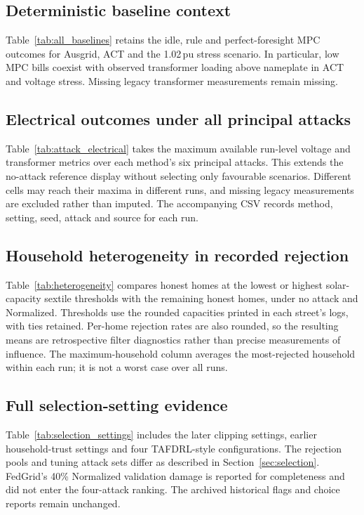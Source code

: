 \subsection{Deterministic baseline context}
Table~\ref{tab:all_baselines} retains the idle, rule and perfect-foresight MPC outcomes for Ausgrid, ACT and the 1.02\,pu stress scenario. In particular, low MPC bills coexist with observed transformer loading above nameplate in ACT and voltage stress. Missing legacy transformer measurements remain missing.


\subsection{Electrical outcomes under all principal attacks}
Table~\ref{tab:attack_electrical} takes the maximum available run-level voltage and transformer metrics over each method's six principal attacks. This extends the no-attack reference display without selecting only favourable scenarios. Different cells may reach their maxima in different runs, and missing legacy measurements are excluded rather than imputed. The accompanying CSV records method, setting, seed, attack and source for each run.


\subsection{Household heterogeneity in recorded rejection}
Table~\ref{tab:heterogeneity} compares honest homes at the lowest or highest solar-capacity sextile thresholds with the remaining honest homes, under no attack and Normalized. Thresholds use the rounded capacities printed in each street's logs, with ties retained. Per-home rejection rates are also rounded, so the resulting means are retrospective filter diagnostics rather than precise measurements of influence. The maximum-household column averages the most-rejected household within each run; it is not a worst case over all runs.


\subsection{Full selection-setting evidence}
Table~\ref{tab:selection_settings} includes the later clipping settings, earlier household-trust settings and four TAFDRL-style configurations. The rejection pools and tuning attack sets differ as described in Section~\ref{sec:selection}. FedGrid's 40\% Normalized validation damage is reported for completeness and did not enter the four-attack ranking. The archived historical flags and choice reports remain unchanged.

